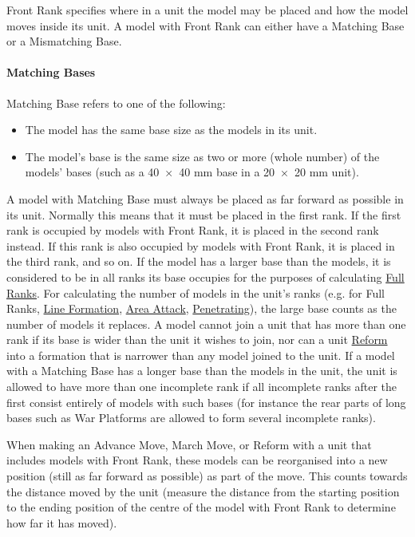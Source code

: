 Front Rank specifies where in a unit the model may be placed and how the model moves inside its unit. A model with Front Rank can either have a Matching Base or a Mismatching Base.

\paragraph{Matching Bases}
\label{matching_bases}

Matching Base refers to one of the following:

\begin{itemize}[label={-}]
\item The model has the same base size as the \rnf{} models in its unit.
\item The model's base is the same size as two or more (whole number) of the \rnf{} models' bases (such as a \num{40x40} \si{\milli\meter} base in a \num{20x20} \si{\milli\meter} unit).
\end{itemize}

A model with Matching Base must always be placed as far forward as possible in its unit. Normally this means that it must be placed in the first rank. If the first rank is occupied by models with Front Rank, it is placed in the second rank instead. If this rank is also occupied by models with Front Rank, it is placed in the third rank, and so on. If the model has a larger base than the \rnf{} models, it is considered to be in all ranks its base occupies for the purposes of calculating \hyperref[full_ranks]{Full Ranks}. For calculating the number of models in the unit's ranks (e.g. for Full Ranks, \hyperref[line_formation]{Line Formation}, \hyperref[area_attack]{Area Attack}, \hyperref[penetrating]{Penetrating}), the large base counts as the number of models it replaces. A model cannot join a unit that has more than one rank if its base is wider than the unit it wishes to join, nor can a unit \hyperref[reform]{Reform} into a formation that is narrower than any model joined to the unit. If a model with a Matching Base has a longer base than the \rnf{} models in the unit, the unit is allowed to have more than one incomplete rank if all incomplete ranks after the first consist entirely of models with such bases (for instance the rear parts of long bases such as War Platforms are allowed to form several incomplete ranks).

When making an Advance Move, March Move, or Reform with a unit that includes models with Front Rank, these models can be reorganised into a new position (still as far forward as possible) as part of the move. This counts towards the distance moved by the unit (measure the distance from the starting position to the ending position of the centre of the model with Front Rank to determine how far it has moved).

